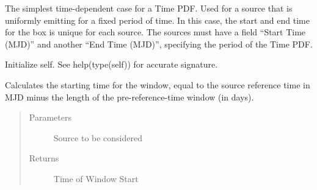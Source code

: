 \documentclass[letterpaper,10pt,english]{sphinxmanual}
\begin{document}
\begin{fulllineitems}
\label{\detokenize{index:flarestack.core.time_pdf.FixedRefBox}}
The simplest time-dependent case for a Time PDF. Used for a source that
is uniformly emitting for a fixed period of time. In this case, the start
and end time for the box is unique for each source. The sources must have
a field “Start Time (MJD)” and another “End Time (MJD)”, specifying the
period of the Time PDF.

\begin{fulllineitems}
\label{\detokenize{index:flarestack.core.time_pdf.FixedRefBox.__init__}}
Initialize self.  See help(type(self)) for accurate signature.

\end{fulllineitems}


\begin{fulllineitems}
\label{\detokenize{index:flarestack.core.time_pdf.FixedRefBox.sig_t0}}
Calculates the starting time for the window, equal to the
source reference time in MJD minus the length of the pre-reference-time
window (in days).
\begin{quote}\begin{description}
\item[{Parameters}] \leavevmode
{} \textendash{} Source to be considered

\item[{Returns}] \leavevmode
Time of Window Start

\end{description}\end{quote}

\end{fulllineitems}



\end{fulllineitems}
\end{document}
